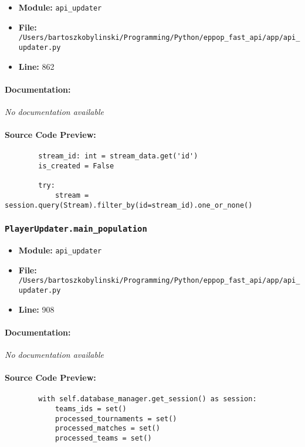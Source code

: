 \documentclass[11pt,a4paper]{article}
\begin{document}
\begin{itemize}
    \item \textbf{Module:} \texttt{api\_updater}
    \item \textbf{File:} \texttt{/Users/bartoszkobylinski/Programming/Python/eppop\_fast\_api/app/api\_updater.py}
    \item \textbf{Line:} 862
\end{itemize}

\paragraph{Documentation:} \textit{No documentation available}

\paragraph{Source Code Preview:}
\begin{verbatim}
        stream_id: int = stream_data.get('id')
        is_created = False

        try:
            stream = session.query(Stream).filter_by(id=stream_id).one_or_none()
\end{verbatim}

\vspace{1em}
\subsubsection{\texttt{PlayerUpdater.main\_population}}

\begin{itemize}
    \item \textbf{Module:} \texttt{api\_updater}
    \item \textbf{File:} \texttt{/Users/bartoszkobylinski/Programming/Python/eppop\_fast\_api/app/api\_updater.py}
    \item \textbf{Line:} 908
\end{itemize}

\paragraph{Documentation:} \textit{No documentation available}

\paragraph{Source Code Preview:}
\begin{verbatim}
        with self.database_manager.get_session() as session:
            teams_ids = set()
            processed_tournaments = set()
            processed_matches = set()
            processed_teams = set()
\end{verbatim}
\end{document}
